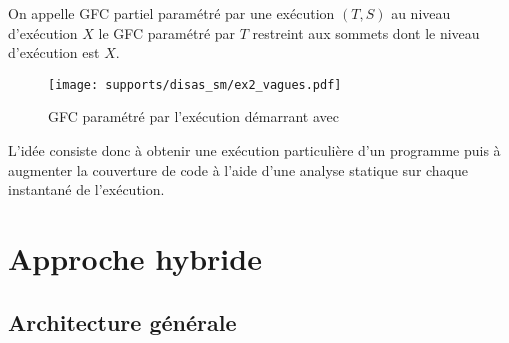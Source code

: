 \begin{defi}
 On appelle GFC partiel paramétré par une exécution $(T, S)$ au niveau d'exécution $X$ le GFC paramétré par $T$ restreint aux sommets dont le niveau d'exécution est $X$.
\label{def:GFC_partiel}
\end{defi}



\begin{figure}[h]
\begin{center}
  \texttt{[image: supports/disas\_sm/ex2\_vagues.pdf]}
\end{center}
\caption{GFC paramétré par l'exécution démarrant avec }
\label{fig:sm_cfg_vagues}
\end{figure}

L'idée consiste donc à obtenir une exécution particulière d'un programme puis à augmenter la couverture de code à l'aide d'une analyse statique sur chaque instantané de l'exécution. 


\FloatBarrier
\section{Approche hybride}
\subsection{Architecture générale}

